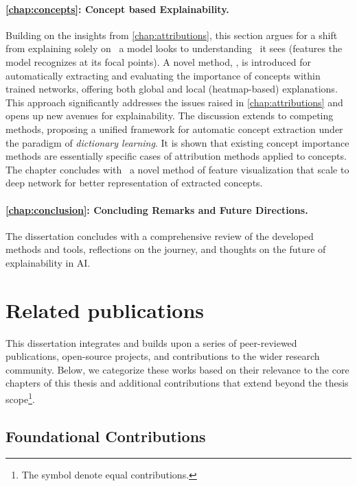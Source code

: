 \paragraph{\autoref{chap:concepts}: Concept based Explainability.} Building on the insights from \autoref{chap:attributions}, this section argues for a shift from explaining solely on \where~a model looks to understanding \what~it sees (\what features the model recognizes at its focal points). A novel method, \craft, is introduced for automatically extracting and evaluating the importance of concepts within trained networks, offering both global and local (heatmap-based) explanations. This approach significantly addresses the issues raised in \autoref{chap:attributions} and opens up new avenues for explainability. The discussion extends to competing methods, proposing a unified framework for automatic concept extraction under the paradigm of \textit{dictionary learning}. It is shown that existing concept importance methods are essentially specific cases of attribution methods applied to concepts. The chapter concludes with \maco~a novel method of feature visualization that scale to deep network for better representation of extracted concepts.

\paragraph{\autoref{chap:conclusion}: Concluding Remarks and Future Directions.} The dissertation concludes with a comprehensive review of the developed methods and tools, reflections on the journey, and thoughts on the future of explainability in AI.

\section{Related publications}

This dissertation integrates and builds upon a series of peer-reviewed publications, open-source projects, and contributions to the wider research community. Below, we categorize these works based on their relevance to the core chapters of this thesis and additional contributions that extend beyond the thesis scope\footnote{The symbol \equal denote equal contributions.}.

\subsection{Foundational Contributions}

